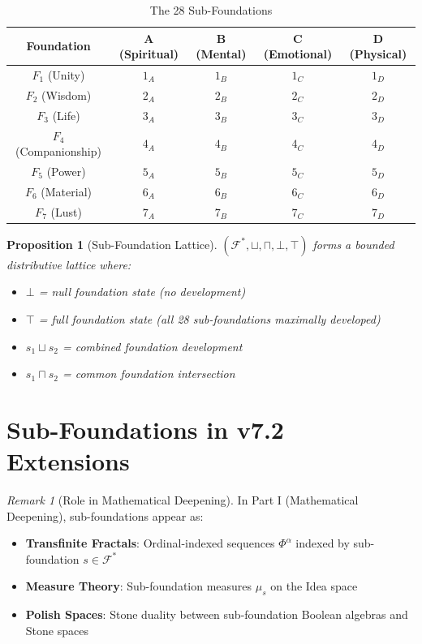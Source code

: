 \documentclass[11pt,twoside,openright]{book}
\theoremstyle{definition}
\theoremstyle{plain}
\newtheorem{proposition}[definition]{Proposition}
\theoremstyle{remark}
\newtheorem{remark}[definition]{Remark}
\newcommand{\Foundations}{\mathcal{F}}
\begin{document}
\begin{table}[ht]
\centering
\caption{The 28 Sub-Foundations}
\label{tab:v72-28-subfoundations}
\begin{tabular}{c|cccc}
\toprule
\textbf{Foundation} & \textbf{A (Spiritual)} & \textbf{B (Mental)} & \textbf{C (Emotional)} & \textbf{D (Physical)} \\
\midrule
$F_1$ (Unity) & $1_A$ & $1_B$ & $1_C$ & $1_D$ \\
$F_2$ (Wisdom) & $2_A$ & $2_B$ & $2_C$ & $2_D$ \\
$F_3$ (Life) & $3_A$ & $3_B$ & $3_C$ & $3_D$ \\
$F_4$ (Companionship) & $4_A$ & $4_B$ & $4_C$ & $4_D$ \\
$F_5$ (Power) & $5_A$ & $5_B$ & $5_C$ & $5_D$ \\
$F_6$ (Material) & $6_A$ & $6_B$ & $6_C$ & $6_D$ \\
$F_7$ (Lust) & $7_A$ & $7_B$ & $7_C$ & $7_D$ \\
\bottomrule
\end{tabular}
\end{table}

\begin{proposition}[Sub-Foundation Lattice]
\label{prop:v72-subfoundation-lattice}
$(\Foundations^*, \sqcup, \sqcap, \bot, \top)$ forms a bounded distributive lattice where:
\begin{itemize}
  \item $\bot$ = null foundation state (no development)
  \item $\top$ = full foundation state (all 28 sub-foundations maximally developed)
  \item $s_1 \sqcup s_2$ = combined foundation development
  \item $s_1 \sqcap s_2$ = common foundation intersection
\end{itemize}
\end{proposition}

\section{Sub-Foundations in v7.2 Extensions}

\begin{remark}[Role in Mathematical Deepening]
\label{rem:subfound-math}
In Part I (Mathematical Deepening), sub-foundations appear as:
\begin{itemize}
  \item \textbf{Transfinite Fractals}: Ordinal-indexed sequences $\Phi^\alpha$ indexed by sub-foundation $s \in \Foundations^*$
  \item \textbf{Measure Theory}: Sub-foundation measures $\mu_s$ on the Idea space
  \item \textbf{Polish Spaces}: Stone duality between sub-foundation Boolean algebras and Stone spaces
\end{itemize}
\end{remark}
\end{document}
